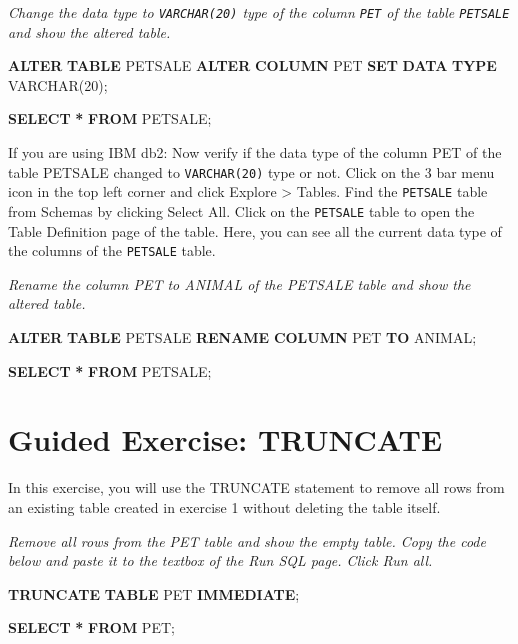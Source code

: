 \documentclass[
]{book}
\newenvironment{Shaded}{\begin{snugshade}}{\end{snugshade}}
\newcommand{\DataTypeTok}[1]{\textcolor[rgb]{0.13,0.29,0.53}{#1}}
\newcommand{\DecValTok}[1]{\textcolor[rgb]{0.00,0.00,0.81}{#1}}
\newcommand{\KeywordTok}[1]{\textcolor[rgb]{0.13,0.29,0.53}{\textbf{#1}}}
\newcommand{\NormalTok}[1]{#1}
\newcommand{\OperatorTok}[1]{\textcolor[rgb]{0.81,0.36,0.00}{\textbf{#1}}}
\begin{document}
{\emph{Change the data type to \texttt{VARCHAR(20)} type of the column \texttt{PET} of the table \texttt{PETSALE} and show the altered table.
}}

\begin{Shaded}
\begin{Highlighting}[]
\KeywordTok{ALTER} \KeywordTok{TABLE}\NormalTok{ PETSALE}
\KeywordTok{ALTER} \KeywordTok{COLUMN}\NormalTok{ PET }\KeywordTok{SET} \KeywordTok{DATA} \KeywordTok{TYPE} \DataTypeTok{VARCHAR}\NormalTok{(}\DecValTok{20}\NormalTok{);}

\KeywordTok{SELECT} \OperatorTok{*} \KeywordTok{FROM}\NormalTok{ PETSALE;}
\end{Highlighting}
\end{Shaded}

If you are using IBM db2:
Now verify if the data type of the column PET of the table PETSALE changed to \texttt{VARCHAR(20)} type or not. Click on the 3 bar menu icon in the top left corner and click Explore \textgreater{} Tables. Find the \texttt{PETSALE} table from Schemas by clicking Select All. Click on the \texttt{PETSALE} table to open the Table Definition page of the table. Here, you can see all the current data type of the columns of the \texttt{PETSALE} table.

{\emph{Rename the column PET to ANIMAL of the PETSALE table and show the altered table.
}}

\begin{Shaded}
\begin{Highlighting}[]
\KeywordTok{ALTER} \KeywordTok{TABLE}\NormalTok{ PETSALE}
\KeywordTok{RENAME} \KeywordTok{COLUMN}\NormalTok{ PET }\KeywordTok{TO}\NormalTok{ ANIMAL;}

\KeywordTok{SELECT} \OperatorTok{*} \KeywordTok{FROM}\NormalTok{ PETSALE;}
\end{Highlighting}
\end{Shaded}

\hypertarget{guided-exercise-truncate}{%
\section{Guided Exercise: TRUNCATE}\label{guided-exercise-truncate}}

In this exercise, you will use the TRUNCATE statement to remove all rows from an existing table created in exercise 1 without deleting the table itself.

{\emph{Remove all rows from the PET table and show the empty table. Copy the code below and paste it to the textbox of the Run SQL page. Click Run all.
}}

\begin{Shaded}
\begin{Highlighting}[]
\KeywordTok{TRUNCATE} \KeywordTok{TABLE}\NormalTok{ PET }\KeywordTok{IMMEDIATE}\NormalTok{;}

\KeywordTok{SELECT} \OperatorTok{*} \KeywordTok{FROM}\NormalTok{ PET;}
\end{Highlighting}
\end{Shaded}


  
\end{document}
